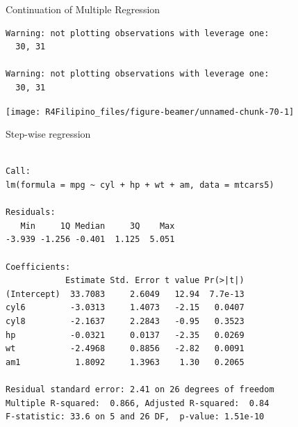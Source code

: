 \begin{frame}[fragile]{Continuation of Multiple Regression}

\begin{Shaded}
\begin{Highlighting}[]
\StringTok{ }\OperatorTok{~}
\NormalTok{(}\NormalTok{(}\NormalTok{,}\NormalTok{))}
\end{Highlighting}
\end{Shaded}

\begin{verbatim}
Warning: not plotting observations with leverage one:
  30, 31

Warning: not plotting observations with leverage one:
  30, 31
\end{verbatim}

\begin{center}\texttt{[image: R4Filipino\_files/figure-beamer/unnamed-chunk-70-1]} \end{center}

\end{frame}

\begin{frame}[fragile]{Step-wise regression}

\begin{Shaded}
\begin{Highlighting}[]
\StringTok{ }\NormalTok{, }\NormalTok{)}
\end{Highlighting}
\end{Shaded}

\begin{verbatim}

Call:
lm(formula = mpg ~ cyl + hp + wt + am, data = mtcars5)

Residuals:
   Min     1Q Median     3Q    Max 
-3.939 -1.256 -0.401  1.125  5.051 

Coefficients:
            Estimate Std. Error t value Pr(>|t|)
(Intercept)  33.7083     2.6049   12.94  7.7e-13
cyl6         -3.0313     1.4073   -2.15   0.0407
cyl8         -2.1637     2.2843   -0.95   0.3523
hp           -0.0321     0.0137   -2.35   0.0269
wt           -2.4968     0.8856   -2.82   0.0091
am1           1.8092     1.3963    1.30   0.2065

Residual standard error: 2.41 on 26 degrees of freedom
Multiple R-squared:  0.866, Adjusted R-squared:  0.84 
F-statistic: 33.6 on 5 and 26 DF,  p-value: 1.51e-10
\end{verbatim}

\end{frame}

